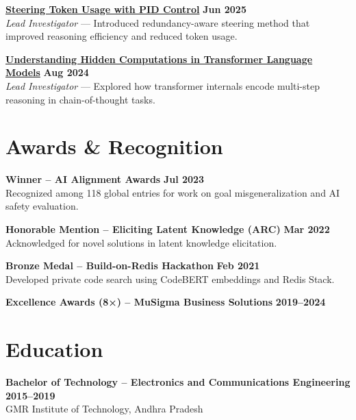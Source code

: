 \documentclass[11pt]{article}
\begin{document}
\textbf{\href{https://arxiv.org/abs/2506.18831}{Steering Token Usage with PID Control}} \hfill \textbf{Jun 2025}\\
\textit{Lead Investigator} — Introduced redundancy-aware steering method that improved reasoning efficiency and reduced token usage.

\textbf{\href{https://arxiv.org/html/2412.04537}{Understanding Hidden Computations in Transformer Language Models}} \hfill \textbf{Aug 2024}\\
\textit{Lead Investigator} — Explored how transformer internals encode multi-step reasoning in chain-of-thought tasks.

\section{Awards \& Recognition}
\textbf{Winner – AI Alignment Awards} \hfill \textbf{Jul 2023}\\
Recognized among 118 global entries for work on goal misgeneralization and AI safety evaluation.

\textbf{Honorable Mention – Eliciting Latent Knowledge (ARC)} \hfill \textbf{Mar 2022}\\
Acknowledged for novel solutions in latent knowledge elicitation.

\textbf{Bronze Medal – Build-on-Redis Hackathon} \hfill \textbf{Feb 2021}\\
Developed private code search using CodeBERT embeddings and Redis Stack.

\textbf{Excellence Awards (8×) – MuSigma Business Solutions} \hfill \textbf{2019–2024}

\section{Education}
\textbf{Bachelor of Technology – Electronics and Communications Engineering} \hfill \textbf{2015–2019}\\
GMR Institute of Technology, Andhra Pradesh
\end{document}
